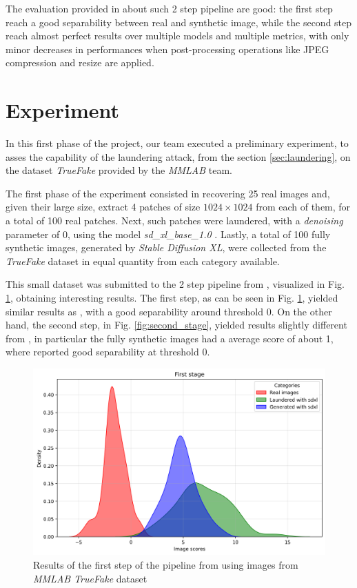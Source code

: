 \documentclass[conference]{IEEEtran} %
\begin{document}
        The evaluation provided in \cite{mandelli2022detecting} about such 2 step pipeline are good: the first step reach a good separability between real and synthetic image, while the second step reach almost perfect results over multiple models and multiple metrics, with only minor decreases in performances when post-processing operations like JPEG compression and resize are applied.

\section{Experiment}
    In this first phase of the project, our team executed a preliminary experiment, to asses the capability of the laundering attack, from the section \ref{sec:laundering}, on the dataset \textit{TrueFake} provided by the \textit{MMLAB} team.

    The first phase of the experiment consisted in recovering 25 real images and, given their large size, extract 4 patches of size $1024\times1024$ from each of them, for a total of 100 real patches. Next, such patches were laundered, with a \textit{denoising} parameter of 0, using the model \textit{sd\_xl\_base\_1.0} \cite{sdxl_base_1_0}. Lastly, a total of 100 fully synthetic images, generated by \textit{Stable Diffusion XL}, were collected from the \textit{TrueFake} dataset in equal quantity from each category available.

    This small dataset was submitted to the 2 step pipeline from \cite{mandelli2024synthetic}, visualized in Fig. \ref{fig:first_stage}, obtaining interesting results. The first step, as can be seen in Fig. \ref{fig:first_stage},  yielded similar results as \cite{mandelli2024synthetic}, with a good separability around threshold 0. On the other hand, the second step, in Fig. \ref{fig:second_stage}, yielded results slightly different from \cite{mandelli2024synthetic}, in particular the fully synthetic images had a average score of about 1, where \cite{mandelli2024synthetic} reported good separability at threshold 0. 

    \begin{figure}[h]
        \centering
        \includegraphics[width=0.95\linewidth]{Img/first_stage.png}
        \caption{Results of the first step of the pipeline from \cite{mandelli2024synthetic} using images from \textit{MMLAB TrueFake} dataset}
        \label{fig:first_stage}
    \end{figure}
\end{document}
